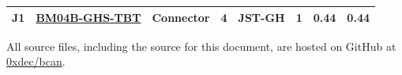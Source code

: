 \documentclass[openbib,letterpaper,10pt]{article}
\begin{document}
\begin{spacing}{1.15}
\begin{appendix}
\begin{singlespacing}
\begin{center}
\begin{longtable}{|l|l|l|c|l|c|r|r|}
			J1 & \href{https://www.digikey.com/product-detail/en/jst-sales-america-inc/BM04B-GHS-TBT(LF)(SN)(N)/455-1580-1-ND/807848}{BM04B-GHS-TBT} & Connector & 4 & JST-GH & 1 & 0.44 & 0.44 \\ \hline

	\end{longtable}
\end{center}
\end{singlespacing}

\begin{center}
All source files, including the source for this document, are hosted on GitHub at \href{https://github.com/0xdec/bcan}{0xdec/bcan}.
\end{center}

\end{appendix}


\end{spacing}
\end{document}
